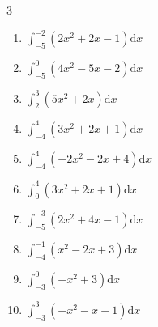 \begin{multicols}{3}
\begin{enumerate}

\columnbreak %

\resetques

  \item $\displaystyle \int_{-5}^{-2}\left( 2x^{2}+2x-1 \right) \mathrm{d}x$


  \item $\displaystyle \int_{-5}^{0}\left( 4x^{2}-5x-2 \right) \mathrm{d}x$


  \item $\displaystyle \int_{2}^{3}\left( 5x^{2}+2x \right) \mathrm{d}x$


  \item $\displaystyle \int_{-4}^{4}\left( 3x^{2}+2x+1 \right) \mathrm{d}x$


  \item $\displaystyle \int_{-4}^{4}\left( -2x^{2}-2x+4 \right) \mathrm{d}x$

        \phantom{$\displaystyle =-80$}

\columnbreak %

  \item $\displaystyle \int_{0}^{4}\left( 3x^{2}+2x+1 \right) \mathrm{d}x$


  \item $\displaystyle \int_{-5}^{-3}\left( 2x^{2}+4x-1 \right) \mathrm{d}x$

        \phantom{$\displaystyle =33$}

  \item $\displaystyle \int_{-4}^{-1}\left( x^{2}-2x+3 \right) \mathrm{d}x$


  \item $\displaystyle \int_{-3}^{0}\left( -x^{2}+3 \right) \mathrm{d}x$


  \item $\displaystyle \int_{-3}^{3}\left( -x^{2}-x+1 \right) \mathrm{d}x$


\end{enumerate}
\end{multicols}
